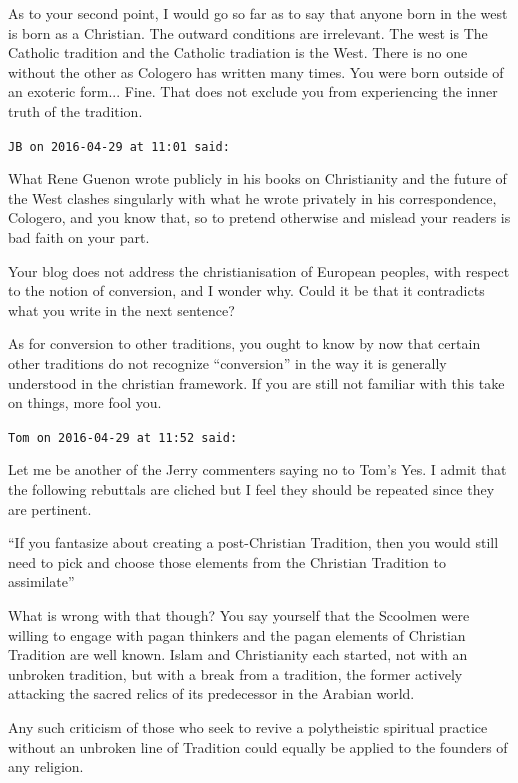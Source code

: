 \begin{footnotesize}
\begin{sffamily}
As to your second point, I would go so far as to say that anyone born in the west is born as a Christian. The outward conditions are irrelevant. The west is The Catholic tradition and the Catholic tradiation is the West. There is no one without the other as Cologero has written many times. You were born outside of an exoteric form... Fine. That does not exclude you from experiencing the inner truth of the tradition.

\hfill

\texttt{JB on 2016-04-29 at 11:01 said:}

What Rene Guenon wrote publicly in his books on Christianity and the future of the West clashes singularly with what he wrote privately in his correspondence, Cologero, and you know that, so to pretend otherwise and mislead your readers is bad faith on your part.

Your blog does not address the christianisation of European peoples, with respect to the notion of conversion, and I wonder why. Could it be that it contradicts what you write in the next sentence?

As for conversion to other traditions, you ought to know by now that certain other traditions do not recognize ``conversion'' in the way it is generally understood in the christian framework. If you are still not familiar with this take on things, more fool you.

\hfill

\texttt{Tom on 2016-04-29 at 11:52 said:}

Let me be another of the Jerry commenters saying no to Tom's Yes. I admit that the following rebuttals are cliched but I feel they should be repeated since they are pertinent.

``If you fantasize about creating a post-Christian Tradition, then you would still need to pick and choose those elements from the Christian Tradition to assimilate''

What is wrong with that though? You say yourself that the Scoolmen were willing to engage with pagan thinkers and the pagan elements of Christian Tradition are well known. Islam and Christianity each started, not with an unbroken tradition, but with a break from a tradition, the former actively attacking the sacred relics of its predecessor in the Arabian world.

Any such criticism of those who seek to revive a polytheistic spiritual practice without an unbroken line of Tradition could equally be applied to the founders of any religion.


\end{sffamily}
\end{footnotesize}

